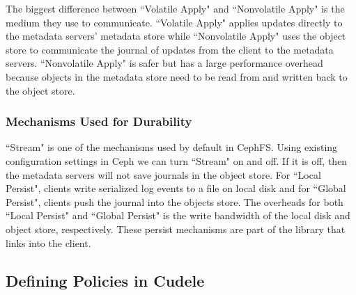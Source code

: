 The biggest difference between ``Volatile Apply" and ``Nonvolatile Apply" is
the medium they use to communicate. ``Volatile Apply" applies updates directly
to the metadata servers' metadata store while ``Nonvolatile Apply" uses the
object store to communicate the journal of updates from the client to the
metadata servers.  ``Nonvolatile Apply" is safer but has a large performance
overhead because objects in the metadata store need to be read from and written
back to the object store.


\subsubsection{Mechanisms Used for Durability} ``Stream" is one of the
mechanisms used by default in CephFS.  Using existing configuration settings in
Ceph we can turn ``Stream" on and off.  If it is off, then the metadata servers
will not save journals in the object store. For ``Local Persist", clients write
serialized log events to a file on local disk and for ``Global Persist",
clients push the journal into the objects store. The overheads for both ``Local
Persist" and ``Global Persist" is the write bandwidth of the local disk and
object store, respectively.  These persist mechanisms are part of the library that
links into the client.

\subsection{Defining Policies in Cudele}
\label{sec:setting-policies-with-cudele}

